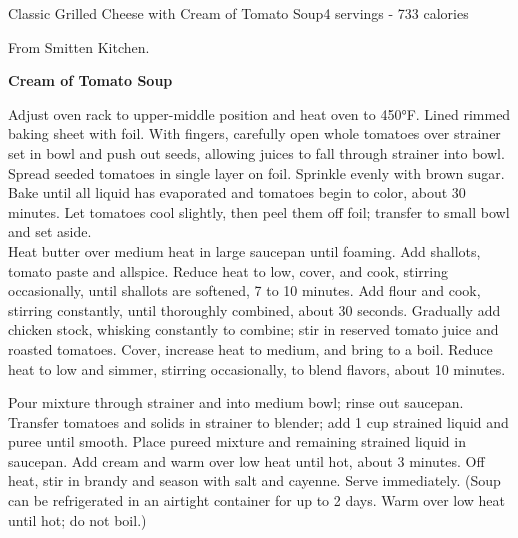 \begin{recipe}{Classic Grilled Cheese with Cream of Tomato Soup}{4 servings - 733 calories}

\freeform From Smitten Kitchen.


\textbf{Cream of Tomato Soup}

Adjust oven rack to upper-middle position and heat oven to 450°F. Lined rimmed baking sheet with foil. With fingers, carefully open whole tomatoes over strainer set in bowl and push out seeds, allowing juices to fall through strainer into bowl. Spread seeded tomatoes in single layer on foil. Sprinkle evenly with brown sugar. Bake until all liquid has evaporated and tomatoes begin to color, about 30 minutes. Let tomatoes cool slightly, then peel them off foil; transfer to small bowl and set aside.\\

Heat butter over medium heat in large saucepan until foaming. Add shallots, tomato paste and allspice. Reduce heat to low, cover, and cook, stirring occasionally, until shallots are softened, 7 to 10 minutes. Add flour and cook, stirring constantly, until thoroughly combined, about 30 seconds. Gradually add chicken stock, whisking constantly to combine; stir in reserved tomato juice and roasted tomatoes. Cover, increase heat to medium, and bring to a boil. Reduce heat to low and simmer, stirring occasionally, to blend flavors, about 10 minutes.\newpage

Pour mixture through strainer and into medium bowl; rinse out saucepan. Transfer tomatoes and solids in strainer to blender; add 1 cup strained liquid and puree until smooth. Place pureed mixture and remaining strained liquid in saucepan. Add cream and warm over low heat until hot, about 3 minutes. Off heat, stir in brandy and season with salt and cayenne. Serve immediately. (Soup can be refrigerated in an airtight container for up to 2 days. Warm over low heat until hot; do not boil.)\\


\end{recipe}
